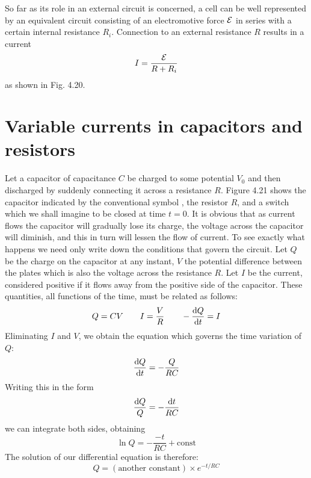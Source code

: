 So far as its role in an external circuit is concerned, a cell can be
well represented by an equivalent circuit consisting of an electromotive
force $\mathcal{E}$ in series with a certain internal resistance $R_i$. 
Connection to an external resistance $R$ results in a current
\begin{equation*}
  I = \frac{\mathcal{E}}{R+R_i}
\end{equation*}
as shown in Fig. 4.20.

\section{Variable currents in capacitors and resistors}

Let a capacitor of capacitance $C$ be charged to some potential $V_0$
and then discharged by suddenly connecting it across a resistance $R$.
Figure 4.21 shows the capacitor indicated by the conventional
symbol
,
the resistor $R$, and a switch which we shall imagine to
be closed at time $t = 0$. It is obvious that as current flows the
capacitor will gradually lose its charge, the voltage across the capacitor
will diminish, and this in turn will lessen the flow of current. To
see exactly what happens we need only write down the conditions
that govern the circuit. Let $Q$ be the charge on the capacitor at any
instant, $V$ the potential difference between the plates which is also
the voltage across the resistance $R$. Let $I$ be the current, considered
positive if it flows away from the positive side of the capacitor. These
quantities, all functions of the time, must be related as follows:
\begin{equation}
  Q = CV \qquad I=\frac{V}{R} \qquad -\frac{\operatorname{d\!} Q}{\operatorname{d\!} t} = I
\end{equation}
Eliminating $I$ and $V$, we obtain the equation which governs the time
variation of $Q$:
\begin{equation}
  \frac{\operatorname{d\!} Q}{\operatorname{d\!} t} = -\frac{Q}{RC}
\end{equation}
Writing this in the form
\begin{equation}
  \frac{\operatorname{d\!} Q}{Q} = -\frac{\operatorname{d\!} t}{RC}
\end{equation}
we can integrate both sides, obtaining
\begin{equation}
  \ln Q = -\frac{-t}{RC} + \text{const}
\end{equation}
The solution of our differential equation is therefore:
\begin{equation}
  Q = (\text{another constant}) \times e^{-t/RC}
\end{equation}

